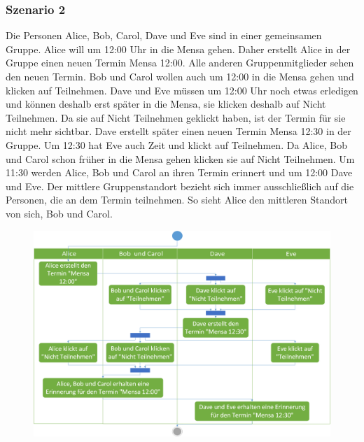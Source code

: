 \documentclass{scrartcl}
\begin{document}
	
	\subsubsection{Szenario 2}
	Die Personen Alice, Bob, Carol, Dave und Eve sind in einer gemeinsamen Gruppe.
	Alice will um 12:00 Uhr in die Mensa gehen. Daher erstellt Alice in der Gruppe einen neuen Termin \glqq{}Mensa 12:00\grqq{}.
	Alle anderen Gruppenmitglieder sehen den neuen Termin. Bob und Carol wollen auch um 12:00 in die Mensa gehen und klicken auf \glqq{}Teilnehmen\grqq{}.
	Dave und Eve müssen um 12:00 Uhr noch etwas erledigen und können deshalb erst später in die Mensa, sie klicken deshalb auf \glqq{}Nicht Teilnehmen\grqq{}.
	Da sie auf \glqq{}Nicht Teilnehmen\grqq{} geklickt haben, ist der Termin für sie nicht mehr sichtbar.
	Dave erstellt später einen neuen Termin \glqq{}Mensa 12:30\grqq{} in der Gruppe.
	Um 12:30 hat Eve auch Zeit und klickt auf \glqq{}Teilnehmen\grqq{}.
	Da Alice, Bob und Carol schon früher in die Mensa gehen klicken sie auf \glqq{}Nicht Teilnehmen\grqq{}.
	Um 11:30 werden Alice, Bob und Carol an ihren Termin erinnert und um 12:00 Dave und Eve.
	Der mittlere Gruppenstandort bezieht sich immer ausschließlich auf die Personen, die an dem Termin teilnehmen.
	So sieht Alice den mittleren Standort von sich, Bob und Carol.	
	\begin{figure}[h]
		\includegraphics[width=\textwidth]{Szenario2}
	\end{figure}
	\newpage
	
\end{document}
